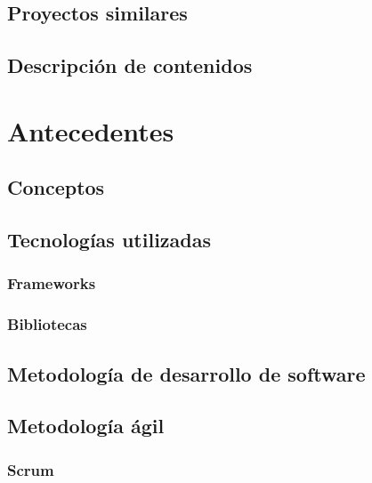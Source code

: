 \documentclass{iccmemoria}
\begin{document}
	\section{Proyectos similares}
	

	\section{Descripción de contenidos}
	

\chapter{Antecedentes}

	\section{Conceptos}
		

	\section{Tecnologías utilizadas}
	\label{sec:Tecnologias}
		
		\subsection{Frameworks}

		
		\subsection{Bibliotecas}

		
		
	\section{Metodología de desarrollo de software}
		

	\section{Metodología ágil}
	

		\subsection{Scrum}
		
\end{document}
